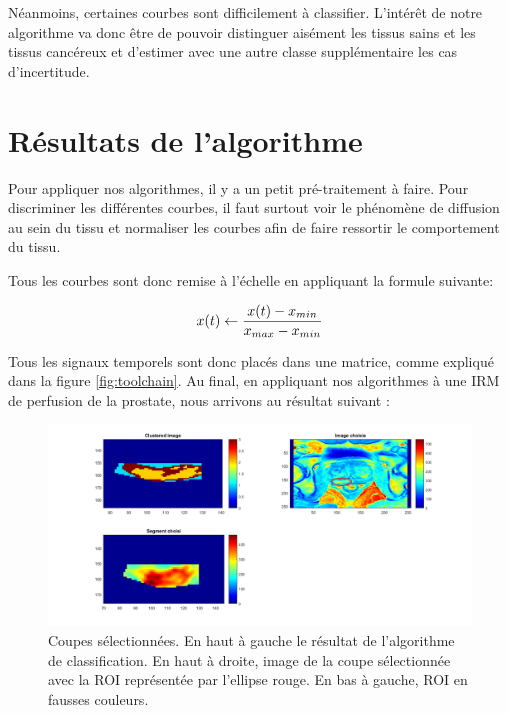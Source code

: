 \medskip

Néanmoins, certaines courbes sont difficilement à classifier. L'intérêt de notre algorithme va donc être de pouvoir distinguer aisément les tissus sains et les tissus cancéreux et d'estimer avec une autre classe supplémentaire les cas d'incertitude.


\section{Résultats de l'algorithme}

Pour appliquer nos algorithmes, il y a un petit pré-traitement à faire. Pour discriminer les différentes courbes, il faut surtout voir le phénomène de diffusion au sein du tissu et normaliser les courbes afin de faire ressortir le comportement du tissu.
\medskip

Tous les courbes sont donc remise à l'échelle en appliquant la formule suivante:

\begin{equation}
\centering
x(t) \gets \frac{x(t)-x_{min}}{x_{max}-x_{min}}
\end{equation} 

\medskip

Tous les signaux temporels sont donc placés dans une matrice, comme expliqué dans la figure \ref{fig:toolchain}. 
Au final, en appliquant nos algorithmes à une IRM de perfusion de la prostate, nous arrivons au résultat suivant :

\begin{figure}[H]
\centering
    \includegraphics[scale=0.4,angle=0]{Images/3classProstate2.png}
    \caption{Coupes sélectionnées. En haut à gauche le résultat de l'algorithme de classification. En haut à droite, image de la coupe sélectionnée avec la ROI représentée par l'ellipse rouge. En bas à gauche, ROI en fausses couleurs.}
    \label{fig:3classProstate2}
\end{figure} 

